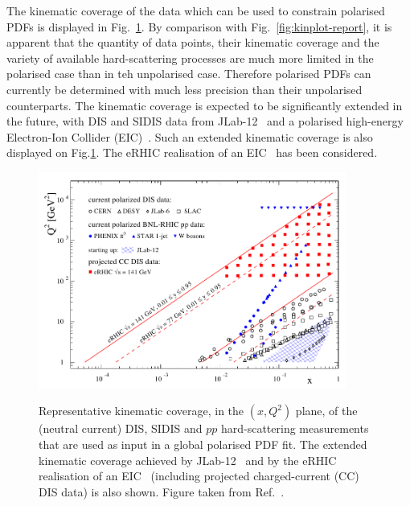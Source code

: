 The kinematic coverage of the data which can be used to constrain polarised 
PDFs is displayed in Fig.~\ref{fig:kinEIC}.
%
By comparison with Fig.~\ref{fig:kinplot-report}, it is apparent that the
quantity of data points, their kinematic coverage and the variety of 
available hard-scattering processes are much more limited in the polarised case
than in teh unpolarised case.
%
Therefore polarised PDFs can currently be determined with much less 
precision than their unpolarised counterparts.
%
The kinematic coverage is expected to be significantly extended in the future,
with DIS and SIDIS data from JLab-12~\cite{Dudek:2012vr} and a polarised 
high-energy Electron-Ion Collider (EIC)~\cite{Accardi:2012qut}.
%
Such an extended kinematic coverage is also displayed on Fig.\ref{fig:kinEIC}.
%
The eRHIC realisation of an EIC~\cite{Aschenauer:2014cki} has been considered.

\begin{figure}[!t]
\centering
\includegraphics[width=0.9\textwidth]{plots/kinEIC}\\
\caption{\small Representative kinematic coverage, in the $(x,Q^2)$ plane,
of the (neutral current) DIS, SIDIS and $pp$ hard-scattering measurements 
that are used as input in a global polarised PDF fit.
%
The extended kinematic coverage achieved by 
JLab-12~\cite{Dudek:2012vr} and by the eRHIC~\cite{Aschenauer:2014cki} 
realisation of an EIC~\cite{Accardi:2012qut}
(including projected charged-current (CC) DIS data) is also shown.
%
Figure taken from Ref.~\cite{Aschenauer:2014cki}.}
\label{fig:kinEIC}
\end{figure}

